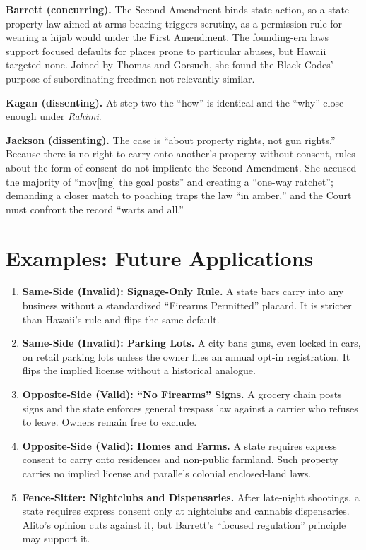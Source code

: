 \documentclass[12pt]{article}
\begin{document}
\textbf{Barrett (concurring).} The Second Amendment binds state action, so a state property law aimed at arms-bearing triggers scrutiny, as a permission rule for wearing a hijab would under the First Amendment. The founding-era laws support focused defaults for places prone to particular abuses, but Hawaii targeted none. Joined by Thomas and Gorsuch, she found the Black Codes' purpose of subordinating freedmen not relevantly similar.

\textbf{Kagan (dissenting).} At step two the ``how'' is identical and the ``why'' close enough under \textit{Rahimi}.

\textbf{Jackson (dissenting).} The case is ``about property rights, not gun rights.'' Because there is no right to carry onto another's property without consent, rules about the form of consent do not implicate the Second Amendment. She accused the majority of ``mov[ing] the goal posts'' and creating a ``one-way ratchet''; demanding a closer match to poaching traps the law ``in amber,'' and the Court must confront the record ``warts and all.''

\section{Examples: Future Applications}

\begin{enumerate}
\item \textbf{Same-Side (Invalid): Signage-Only Rule.} A state bars carry into any business without a standardized ``Firearms Permitted'' placard. It is stricter than Hawaii's rule and flips the same default.
\item \textbf{Same-Side (Invalid): Parking Lots.} A city bans guns, even locked in cars, on retail parking lots unless the owner files an annual opt-in registration. It flips the implied license without a historical analogue.
\item \textbf{Opposite-Side (Valid): ``No Firearms'' Signs.} A grocery chain posts signs and the state enforces general trespass law against a carrier who refuses to leave. Owners remain free to exclude.
\item \textbf{Opposite-Side (Valid): Homes and Farms.} A state requires express consent to carry onto residences and non-public farmland. Such property carries no implied license and parallels colonial enclosed-land laws.
\item \textbf{Fence-Sitter: Nightclubs and Dispensaries.} After late-night shootings, a state requires express consent only at nightclubs and cannabis dispensaries. Alito's opinion cuts against it, but Barrett's ``focused regulation'' principle may support it.
\end{enumerate}
\end{document}
